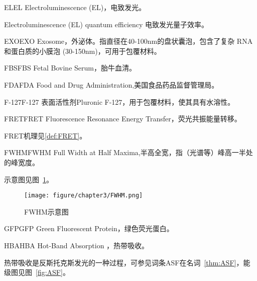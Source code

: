 \documentclass[cn,11pt,chinese]{elegantbook}
\begin{document}
\begin{theorem}{EL}{EL} 
 Electroluminescence (EL)，电致发光。 

 Electroluminescence (EL) quantum efficiency  电致发光量子效率。
\end{theorem}

\begin{theorem}{EXO}{EXO} 
  Exosome，外泌体。指直径在40-100nm的盘状囊泡，包含了复杂 RNA 和蛋白质的小膜泡 (30-150nm)，可用于包覆材料。
\end{theorem}

\begin{theorem}{FBS}{FBS} 
  Fetal Bovine Serum，胎牛血清。

\end{theorem}  

\begin{theorem}{FDA}{FDA} 
  Food and Drug Administration,美国食品药品监督管理局。
\end{theorem}

\begin{theorem}{F-127}{F-127} 
  表面活性剂Pluronic F-127，用于包覆材料，使其具有水溶性。
\end{theorem}

\begin{theorem}{FRET}{FRET} 
Fluorescence Resonance Energy Transfer，荧光共振能量转移。
\end{theorem}
\begin{note}
FRET机理见\vref{def:FRET}。
\end{note}

\begin{theorem}{FWHM}{FWHM} 
  Full Width at Half Maxima,半高全宽，指（光谱等）峰高一半处的峰宽度。
  
  示意图见图~\ref{fig:FWHM}。
  \end{theorem}

  \begin{figure}[h]
    \centering
    \texttt{[image: figure/chapter3/FWHM.png]}
    \caption{FWHM示意图}
    \label{fig:FWHM}
  \end{figure}
  

  
\begin{theorem}{GFP}{GFP} 
  Green Fluorescent Protein，绿色荧光蛋白。
  \end{theorem}

\begin{theorem}{HBA}{HBA} 
  Hot-Band Absorption ，热带吸收。

  热带吸收是反斯托克斯发光的一种过程，可参见词条ASF在名词~\vref{thm:ASF}，能级图见图~\vref{fig:ASF}。
  \end{theorem}
\end{document}
